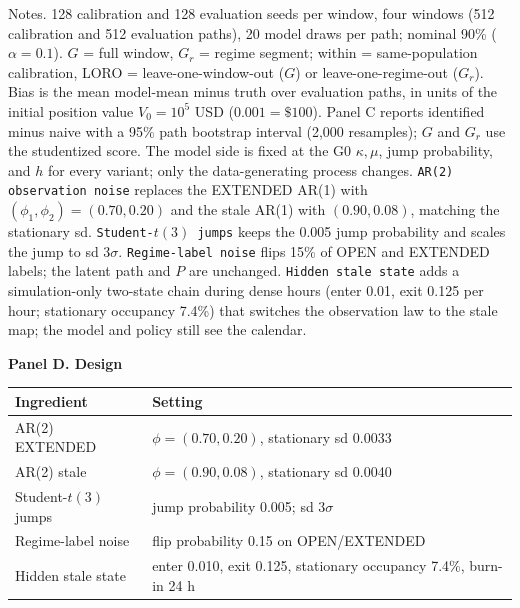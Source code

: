 \begin{table}[!htbp]
\par\noindent\begin{minipage}{\linewidth}\raggedright{\scriptsize Notes. 128 calibration and 128 evaluation seeds per window, four windows (512 calibration and 512 evaluation paths), 20 model draws per path; nominal 90\% ($\alpha=0.1$). $G$ = full window, $G_r$ = regime segment; within = same-population calibration, LORO = leave-one-window-out ($G$) or leave-one-regime-out ($G_r$). Bias is the mean model-mean minus truth over evaluation paths, in units of the initial position value $V_0=10^5$ USD ($0.001=\$100$). Panel C reports identified minus naive with a 95\% path bootstrap interval (2,000 resamples); $G$ and $G_r$ use the studentized score. The model side is fixed at the G0 $\kappa,\mu$, jump probability, and $h$ for every variant; only the data-generating process changes. \texttt{AR(2) observation noise} replaces the EXTENDED AR(1) with $(\phi_1,\phi_2)=(0.70,0.20)$ and the stale AR(1) with $(0.90,0.08)$, matching the stationary sd. \texttt{Student-$t(3)$ jumps} keeps the 0.005 jump probability and scales the jump to sd $3\sigma$. \texttt{Regime-label noise} flips 15\% of OPEN and EXTENDED labels; the latent path and $P$ are unchanged. \texttt{Hidden stale state} adds a simulation-only two-state chain during dense hours (enter 0.01, exit 0.125 per hour; stationary occupancy 7.4\%) that switches the observation law to the stale map; the model and policy still see the calendar.}\end{minipage}\par

\par\textbf{Panel D. Design}

\begin{adjustbox}{max width=\linewidth}
\begin{tabular}{@{}ll@{}}
\toprule
Ingredient & Setting \\
\midrule
AR(2) EXTENDED & $\phi=(0.70, 0.20)$, stationary sd 0.0033 \\
AR(2) stale & $\phi=(0.90, 0.08)$, stationary sd 0.0040 \\
Student-$t(3)$ jumps & jump probability 0.005; sd $3\sigma$ \\
Regime-label noise & flip probability 0.15 on OPEN/EXTENDED \\
Hidden stale state & enter 0.010, exit 0.125, stationary occupancy 7.4\%, burn-in 24 h \\
\bottomrule
\end{tabular}
\end{adjustbox}
\vspace{0.5em}
\end{table}
